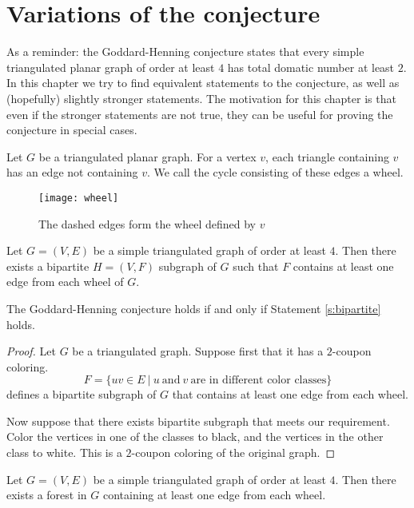 \section{Variations of the conjecture}

As a reminder: the Goddard-Henning conjecture states that every simple triangulated
planar graph of order at least $4$ has total domatic number at least $2$. In this
chapter we try to find equivalent statements to the
conjecture, as well as (hopefully) slightly stronger statements. The motivation for
this chapter is that even if the stronger
statements are not true, they can be useful for proving the conjecture in special cases.

\begin{definition}
  Let $G$ be a triangulated planar graph. For a vertex $v$, each triangle
  containing $v$ has an edge not containing $v$. We call the cycle consisting of
  these edges a wheel.
\end{definition}

\begin{figure}[ht]
  \centering
  \texttt{[image: wheel]}
  \caption{The dashed edges form the wheel defined by $v$ }
  \label{fig:wheel}
\end{figure}

\begin{guess}\label{s:bipartite}
  Let $G = (V, E)$ be a simple triangulated graph of order at least $4$. Then there
  exists a bipartite $H = (V, F)$ subgraph of $G$ such that $F$ contains at
  least one edge from each wheel of $G$.
\end{guess}

\begin{claim}
  The Goddard-Henning conjecture holds if and only if Statement \ref{s:bipartite} holds.
\end{claim}
\begin{proof}
  Let $G$ be a triangulated graph. Suppose first that it has a $2$-coupon coloring.
  $$F = \{uv \in E\ |\ u\ \textrm{and}\ v\ \textrm{are in different color classes}\}$$
  defines a bipartite subgraph of $G$ that contains at least one edge from each wheel.

  Now suppose that there exists bipartite subgraph that meets our requirement. Color
  the vertices in one of the classes to black, and the vertices in the other class
  to white. This is a $2$-coupon coloring of the original graph.
\end{proof}

\begin{guess}\label{s:forest}
  Let $G = (V, E)$ be a simple triangulated graph of order at least $4$. Then there
  exists a forest in $G$ containing at least one edge from each wheel.
\end{guess}

